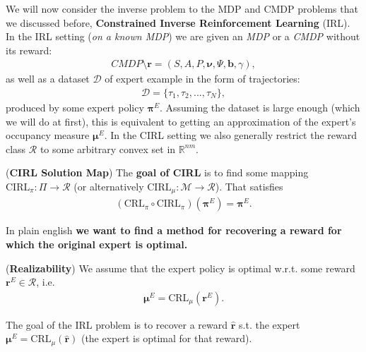 We will now consider the inverse problem to the MDP and CMDP problems that we discussed before, \textbf{Constrained Inverse Reinforcement Learning} (IRL). In the IRL setting (\textit{on a known MDP}) we are given an \textit{MDP} or a \textit{CMDP} without its reward:
\begin{align*}
    \textit{CMDP} \setminus \bm{r} = (S,A,P,\bm{\nu},\Psi,\bm{b},\gamma),
\end{align*}
as well as a dataset $\mathcal{D}$ of expert example in the form of trajectories:
\begin{align*}
    \mathcal{D} = \{  \tau_1,\tau_2,...,\tau_N\},
\end{align*}
produced by some expert policy $\bm{\pi}^E$. Assuming the dataset is large enough (which we will do at first), this is equivalent to getting an approximation of the expert's occupancy measure $\bm{\mu}^E$. In the CIRL setting we also generally restrict the reward class $\mathcal{R}$ to some arbitrary convex set in $\mathbb{R}^{nm}$. \\
\begin{definition}
    (\textbf{CIRL Solution Map})
    The \textbf{goal of CIRL} is to find some mapping $\text{CIRL}_\pi : \Pi \rightarrow \mathcal{R}$ (or alternatively $\text{CIRL}_\mu : \mathcal{M} \rightarrow \mathcal{R}$). That satisfies
    \begin{align*}
        (\text{CRL}_\pi \circ \text{CIRL}_\pi)(\bm{\pi}^E) = \bm{\pi}^E.
    \end{align*}
\end{definition}
In plain english \textbf{we want to find a method for recovering a reward for which the original expert is optimal.}

\begin{assumption}
    \label{assumption:realizability}
    (\textbf{Realizability})
    We assume that the expert policy is optimal w.r.t. some reward $\bm{r}^E \in \mathcal{R}$, i.e. 
    \begin{align*}
        \bm{\mu}^E = \text{CRL}_{\mu}(\bm{r}^E).
    \end{align*}
\end{assumption}
\noindent
The goal of the IRL problem is to recover a reward $\hat{\bm{r}}$ s.t. the expert $\bm{\mu}^E = \text{CRL}_{\mu}(\hat{\bm{r}})$ (the expert is optimal for that reward).

